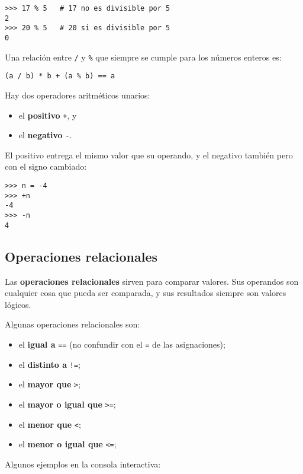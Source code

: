 \begin{lstlisting}
>>> 17 % 5   # 17 no es divisible por 5
2
>>> 20 % 5   # 20 si es divisible por 5
0
\end{lstlisting}

Una relación entre \lstinline!/! y \lstinline!%! que siempre se cumple
para los números enteros es:

\begin{lstlisting}
(a / b) * b + (a % b) == a
\end{lstlisting}

Hay dos operadores aritméticos unarios:

\begin{itemize}
\item
  el \textbf{positivo} \lstinline!+!, y
\item
  el \textbf{negativo} \lstinline!-!.
\end{itemize}

El positivo entrega el mismo valor que su operando, y el negativo
también pero con el signo cambiado:

\begin{lstlisting}
>>> n = -4
>>> +n
-4
>>> -n
4
\end{lstlisting}

\subsection{Operaciones relacionales}

Las \textbf{operaciones relacionales} sirven para comparar valores. Sus
operandos son cualquier cosa que pueda ser comparada, y sus resultados
siempre son valores lógicos.

Algunas operaciones relacionales son:

\begin{itemize}
\item
  el \textbf{igual a} \lstinline!==! (no confundir con el \lstinline!=!
  de las asignaciones);
\item
  el \textbf{distinto a} \lstinline"!=";
\item
  el \textbf{mayor que} \lstinline!>!;
\item
  el \textbf{mayor o igual que} \lstinline!>=!;
\item
  el \textbf{menor que} \lstinline!<!;
\item
  el \textbf{menor o igual que} \lstinline!<=!;
\end{itemize}

Algunos ejemplos en la consola interactiva:

